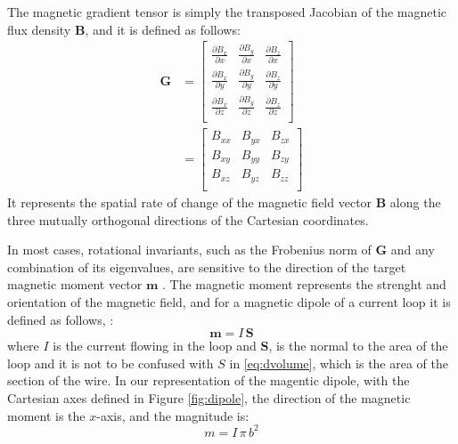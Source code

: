 The magnetic gradient tensor is simply the transposed Jacobian of the magnetic flux density $\mathbf{B}$, and it is defined
as follows:
\begin{equation}
\begin{aligned}
\mathbf{G} &= 
\begin{bmatrix}
    \frac{\partial B_x}{\partial x} & \frac{\partial B_y}{\partial x} & \frac{\partial B_z}{\partial x}\\
    \frac{\partial B_x}{\partial y} & \frac{\partial B_y}{\partial y} & \frac{\partial B_z}{\partial y}\\
    \frac{\partial B_x}{\partial z} & \frac{\partial B_y}{\partial z} & \frac{\partial B_z}{\partial z}\\
\end{bmatrix}
\\
&=
\begin{bmatrix}
    B_{xx} & B_{yx} & B_{zx}\\
    B_{xy} & B_{yy} & B_{zy}\\
    B_{xz} & B_{yz} & B_{zz}\\
\end{bmatrix}
\end{aligned}
\label{eq:Jacobian}
\end{equation}
It represents the spatial rate of change of the magnetic field vector $\mathbf{B}$
along the three mutually orthogonal directions of the Cartesian coordinates.

In most cases, rotational invariants,
such as the Frobenius norm of $\mathbf{G}$ and any combination of its
eigenvalues, are sensitive to the direction of the target magnetic
moment vector $\mathbf{m}$ \cite{NSS_single_localization}. The magnetic moment represents the strenght 
and orientation of the magnetic field, and for a magnetic dipole of a current
loop it is defined as follows, \cite{book-magnetism}:
\begin{equation}
    \mathbf{m} = I \, \mathbf{S}
\end{equation}
where $I$ is the current flowing in the loop and $\mathbf{S}$, is the normal to the area of the loop
and it is not to be confused with $S$ in \ref{eq:dvolume}, which is the area
of the section of the wire.
In our representation of the magentic dipole, with the Cartesian axes
defined in Figure \ref{fig:dipole}, the direction of the magnetic moment is the $x$-axis,
and the magnitude is:
\begin{equation}
    m = I \, \pi \, b^2
    \label{eq:magnetic_moment}  
\end{equation}


